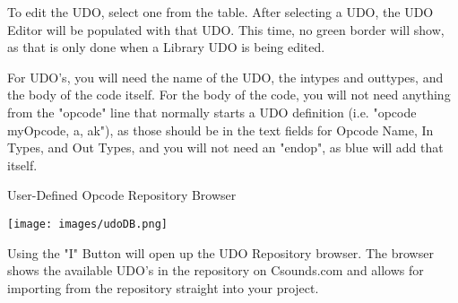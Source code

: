 To edit the UDO, select one from the table. After selecting a UDO, the
UDO Editor will be populated with that UDO. This time, no green border
will show, as that is only done when a Library UDO is being edited.

For UDO's, you will need the name of the UDO, the intypes and outtypes,
and the body of the code itself. For the body of the code, you will not
need anything from the "opcode" line that normally starts a UDO
definition (i.e. "opcode myOpcode, a, ak"), as those should be in the
text fields for Opcode Name, In Types, and Out Types, and you will not
need an "endop", as blue will add that itself.

User-Defined Opcode Repository Browser

\texttt{[image: images/udoDB.png]}

Using the "I" Button will open up the UDO Repository browser. The
browser shows the available UDO's in the repository on Csounds.com and
allows for importing from the repository straight into your project.
